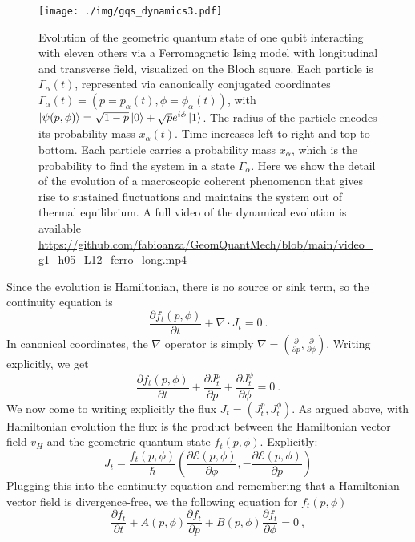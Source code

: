 \documentclass[draft,nofootinbib,pre,twocolumn,showpacs,showkeys,preprintnumbers,floatfix]{revtex4-1}
\newcommand{\1}{\mathbbm{1}}
\newcommand{\p}{\partial}
\begin{document}
\begin{figure}[t!]
\centering
\texttt{[image: ./img/gqs\_dynamics3.pdf]}
\caption{Evolution of the geometric quantum state of one qubit interacting with 
	eleven others via a Ferromagnetic Ising model with longitudinal and transverse field, 
	visualized on the Bloch square. Each particle is $\Gamma_\alpha(t)$, represented via
	canonically conjugated coordinates $\Gamma_\alpha(t) = \left( p=p_\alpha(t),\phi=\phi_\alpha(t)\right)$, with $\ket{\psi(p,\phi)} = 
	\sqrt{1-p} \ket{0}+ \sqrt{p} e^{i\phi}\ket{1}$. The radius of the particle encodes its 
	probability mass $x_\alpha(t)$. Time increases left to right and top to bottom. Each particle
	carries a probability mass $x_\alpha$, which is the probability to find the system in a 
	state $\Gamma_\alpha$. Here we show the detail of the evolution of a macroscopic 
	coherent phenomenon that gives rise to sustained fluctuations and maintains the
	system out of thermal equilibrium. A full video of the dynamical evolution is available 
	\url{https://github.com/fabioanza/GeomQuantMech/blob/main/video_g1_h05_L12_ferro_long.mp4}
	}
\label{fig:gqs_dynamics3}
\end{figure}
Since the evolution is Hamiltonian, there is no source or sink term, so the continuity equation is 
\begin{equation}
\frac{\partial f_t(p,\phi)}{\partial t} + \nabla \cdot J_t = 0~.
\end{equation}
In canonical coordinates, the $\nabla$ operator is simply $\nabla = (\frac{\p }{\p p},\frac{\p }{\p \phi})$.
Writing explicitly, we get
\begin{equation}
\frac{\partial f_t(p,\phi)}{\partial t} + \frac{\p J_t^p}{\p p} + \frac{\p J_t^{\phi}}{\p \phi} = 0~.
\end{equation}
We now come to writing explicitly the flux $J_t = (J_t^p,J_t^{\phi})$. As argued above, 
with Hamiltonian evolution the flux is the product between the Hamiltonian vector 
field $v_H$ and the geometric quantum state $f_t(p,\phi)$. Explicitly:
\begin{equation}
J_t =  \frac{f_t(p,\phi)}{\hbar} \left(\frac{\p \mathcal{E}(p,\phi)}{\p \phi}, -\frac{\p \mathcal{E}(p,\phi)}{\p p}\right)
\end{equation}
Plugging this into the continuity equation and remembering that a Hamiltonian vector field is 
divergence-free, we the following equation for $f_t(p,\phi)$
\begin{equation}
\frac{\partial f_t}{\partial t} + A(p,\phi) \frac{\partial f_t}{\partial p} + B(p,\phi) \frac{\partial f_t}{\partial \phi} = 0~,
\end{equation}
\end{document}
